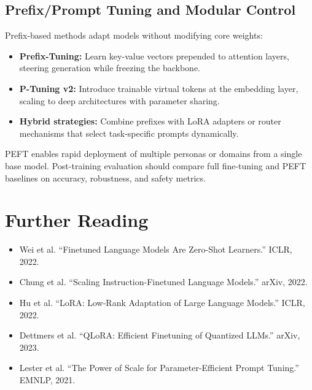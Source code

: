 \documentclass{article}
\begin{document}
\subsection{Prefix/Prompt Tuning and Modular Control}
Prefix-based methods adapt models without modifying core weights:
\begin{itemize}
  \item \textbf{Prefix-Tuning:} Learn key-value vectors prepended to attention layers, steering generation while freezing the backbone.
  \item \textbf{P-Tuning v2:} Introduce trainable virtual tokens at the embedding layer, scaling to deep architectures with parameter sharing.
  \item \textbf{Hybrid strategies:} Combine prefixes with LoRA adapters or router mechanisms that select task-specific prompts dynamically.
\end{itemize}
PEFT enables rapid deployment of multiple personas or domains from a single base model. Post-training evaluation should compare full fine-tuning and PEFT baselines on accuracy, robustness, and safety metrics.

\section*{Further Reading}
\begin{itemize}
  \item Wei et al. ``Finetuned Language Models Are Zero-Shot Learners.'' ICLR, 2022.
  \item Chung et al. ``Scaling Instruction-Finetuned Language Models.'' arXiv, 2022.
  \item Hu et al. ``LoRA: Low-Rank Adaptation of Large Language Models.'' ICLR, 2022.
  \item Dettmers et al. ``QLoRA: Efficient Finetuning of Quantized LLMs.'' arXiv, 2023.
  \item Lester et al. ``The Power of Scale for Parameter-Efficient Prompt Tuning.'' EMNLP, 2021.
\end{itemize}
\end{document}
